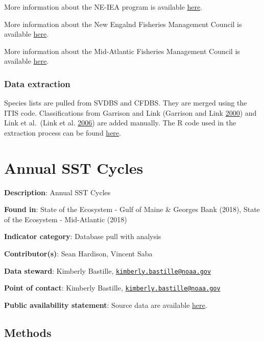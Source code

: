 \documentclass[
]{book}
\begin{document}
More information about the NE-IEA program is available \href{http://integratedecosystemassessment.noaa.gov}{here}.

More information about the New Engalnd Fisheries Management Council is available \href{https://www.nefmc.org/}{here}.

More information about the Mid-Atlantic Fisheries Management Council is available \href{http://www.mafmc.org/}{here}.

\hypertarget{data-extraction}{%
\subsection{Data extraction}\label{data-extraction}}

Species lists are pulled from SVDBS and CFDBS. They are merged using the ITIS code. Classifications from Garrison and Link (Garrison and Link \protect\hyperlink{ref-garrison2000dietary}{2000}) and Link et al.~(Link et al. \protect\hyperlink{ref-link2006EMAX}{2006}) are added manually. The R code used in the extraction process can be found \href{https://github.com/slucey/RSurvey/blob/master/Species_list.R}{here}.

\hypertarget{annual-sst-cycles}{%
\chapter{Annual SST Cycles}\label{annual-sst-cycles}}

\textbf{Description}: Annual SST Cycles

\textbf{Found in}: State of the Ecosystem - Gulf of Maine \& Georges Bank (2018), State of the Ecosystem - Mid-Atlantic (2018)

\textbf{Indicator category}: Database pull with analysis

\textbf{Contributor(s)}: Sean Hardison, Vincent Saba

\textbf{Data steward}: Kimberly Bastille, \href{mailto:kimberly.bastille@noaa.gov}{\nolinkurl{kimberly.bastille@noaa.gov}}

\textbf{Point of contact}: Kimberly Bastille, \href{mailto:kimberly.bastille@noaa.gov}{\nolinkurl{kimberly.bastille@noaa.gov}}

\textbf{Public availability statement}: Source data are available \href{https://www.esrl.noaa.gov/psd/data/gridded/data.noaa.oisst.v2.highres.html}{here}.

\hypertarget{methods-1}{%
\section{Methods}\label{methods-1}}
\end{document}
